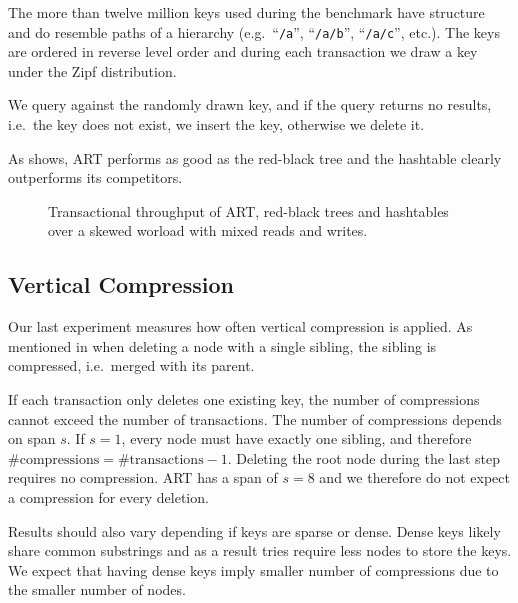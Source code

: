 \documentclass[abstracton,12pt]{scrartcl}
\theoremstyle{definition}
\begin{document}
The more than twelve million keys used during the benchmark have structure
and do resemble paths of a hierarchy (e.g.\ ``\texttt{/a}'', ``\texttt{/a/b}'',
``\texttt{/a/c}'', etc.). The keys are ordered in reverse level order and
during each transaction we draw a key under the Zipf distribution.

We query against the randomly drawn key, and if the query returns no results,
i.e.\ the key does not exist, we insert the key, otherwise we delete it.

As  shows, ART performs as good as the red-black tree and the
hashtable clearly outperforms its competitors.

\begin{figure}[H]
  \centering
  \caption{Transactional throughput of ART,
    red-black trees and hashtables over a skewed worload with
    mixed reads and writes.}
  \label{fig:main-benchmark}
\end{figure}

\subsection{Vertical Compression}
\label{sec:compression-benchmark}

Our last experiment measures how often vertical compression is applied.
As mentioned in  when deleting a node with
a single sibling, the sibling is compressed, i.e.\ merged with its parent.

If each transaction only deletes one existing key, the number of compressions
cannot exceed the number of transactions. The number of compressions
depends on span $s$. If $s=1$, every node must have exactly one sibling,
and therefore $\text{\#compressions}=\text{\#transactions}-1$. Deleting the
root node during the last step requires no compression. ART has a span of $s=8$
and we therefore do not expect a compression for every deletion.

Results should also vary depending if keys are sparse or dense. Dense keys
likely share common substrings and as a result tries require less nodes to 
store the keys. We expect that having dense keys imply smaller number
of compressions due to the smaller number of nodes.
\end{document}
